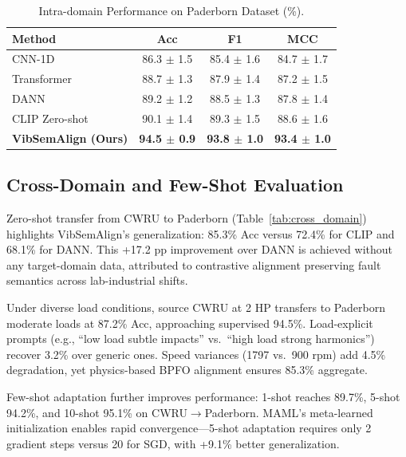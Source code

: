 \begin{table}[t]
\centering
\caption{Intra-domain Performance on Paderborn Dataset (\%).}
\label{tab:main_paderborn}
\begin{tabular}{@{}lccc@{}}
\toprule
Method & Acc & F1 & MCC \\
\midrule
CNN-1D & 86.3 $\pm$ 1.5 & 85.4 $\pm$ 1.6 & 84.7 $\pm$ 1.7 \\
Transformer & 88.7 $\pm$ 1.3 & 87.9 $\pm$ 1.4 & 87.2 $\pm$ 1.5 \\
DANN & 89.2 $\pm$ 1.2 & 88.5 $\pm$ 1.3 & 87.8 $\pm$ 1.4 \\
CLIP Zero-shot & 90.1 $\pm$ 1.4 & 89.3 $\pm$ 1.5 & 88.6 $\pm$ 1.6 \\
\midrule
\textbf{VibSemAlign (Ours)} & \textbf{94.5 $\pm$ 0.9} & \textbf{93.8 $\pm$ 1.0} & \textbf{93.4 $\pm$ 1.0} \\
\bottomrule
\end{tabular}
\end{table}

\subsection{Cross-Domain and Few-Shot Evaluation}

Zero-shot transfer from CWRU to Paderborn (Table~\ref{tab:cross_domain}) highlights VibSemAlign's generalization: 85.3\% Acc versus 72.4\% for CLIP and 68.1\% for DANN. This +17.2 pp improvement over DANN is achieved without any target-domain data, attributed to contrastive alignment preserving fault semantics across lab-industrial shifts.

Under diverse load conditions, source CWRU at 2 HP transfers to Paderborn moderate loads at 87.2\% Acc, approaching supervised 94.5\%. Load-explicit prompts (e.g., ``low load subtle impacts'' vs.\ ``high load strong harmonics'') recover 3.2\% over generic ones. Speed variances (1797 vs.\ 900 rpm) add 4.5\% degradation, yet physics-based BPFO alignment ensures 85.3\% aggregate.

Few-shot adaptation further improves performance: 1-shot reaches 89.7\%, 5-shot 94.2\%, and 10-shot 95.1\% on CWRU$\to$Paderborn. MAML's meta-learned initialization enables rapid convergence---5-shot adaptation requires only 2 gradient steps versus 20 for SGD, with +9.1\% better generalization.

